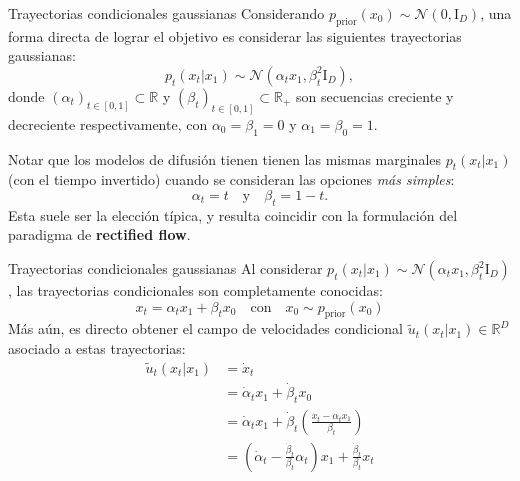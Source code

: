 \documentclass{beamer}
\newcommand{\R}{\mathbb{R}}
\begin{document}
\begin{frame}{Trayectorias condicionales gaussianas}
    Considerando $p_\text{prior}(x_0)\sim\mathcal{N}(0,\text{I}_D)$, una forma directa de lograr el objetivo es considerar las siguientes trayectorias gaussianas:
    \begin{equation*}
        p_t(x_t|x_1)\sim\mathcal{N}(\alpha_t x_1,\beta_t^2\text{I}_D),
    \end{equation*}
    donde $\left(\alpha_t\right)_{t\in[0,1]}\subset \R$ y $\left(\beta_t\right)_{t\in[0,1]}\subset \R_+$ son secuencias creciente y decreciente respectivamente, con $\alpha_0=\beta_1=0$ y $\alpha_1=\beta_0=1$.

    Notar que los modelos de difusión tienen tienen las mismas marginales $p_t(x_t|x_1)$ (con el tiempo invertido) cuando se consideran las opciones \textit{más simples}:
    \begin{equation*}
        \alpha_t=t
        \quad\text{y}\quad
        \beta_t=1-t.
    \end{equation*}
    Esta suele ser la elección típica, y resulta coincidir con la formulación del paradigma de \textbf{rectified flow}.
\end{frame}

\begin{frame}{Trayectorias condicionales gaussianas}
    Al considerar $p_t(x_t|x_1)\sim\mathcal{N}(\alpha_t x_1,\beta_t^2\text{I}_D)$, las trayectorias condicionales son completamente conocidas:
    \begin{equation*}
        x_t=\alpha_t x_1+\beta_t x_0
        \quad\text{con}\quad
        x_0\sim p_\text{prior}(x_0)
    \end{equation*}
    Más aún, es directo obtener el campo de velocidades condicional $\tilde u_t(x_t|x_1)\in\R^D$ asociado a estas trayectorias:
    \begin{align*}
        \tilde u_t(x_t|x_1) & =\dot x_t                                                                                          \\
                            & = \dot \alpha_t x_1+\dot\beta_t x_0                                                                \\
                            & =\dot \alpha_t x_1+\dot\beta_t \left(\frac{x_t-\alpha_tx_1}{\beta_t}\right)                        \\
                            & = \left(\dot\alpha_t-\frac{\dot \beta_t}{\beta_t}\alpha_t\right)x_1+\frac{\dot\beta_t}{\beta_t}x_t
    \end{align*}
\end{frame}
\end{document}
